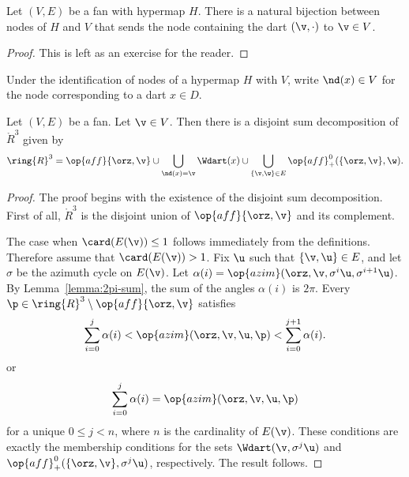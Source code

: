
\begin{lemma}[]\label{lemma:node-vertex}
Let $(V,E)$ be a fan with hypermap $H$.  There is a natural bijection between
nodes of $H$ and $V$ that sends the node containing the dart $(\v,\cdot)$
to $\v\in V$.
\end{lemma}

\begin{proof}  This is left as an exercise for the reader.
\end{proof}

\begin{definition}[$\nd$]
Under the identification of nodes of a hypermap $H$ with $V$,
write $\nd(x)\in V$ for the node corresponding to a dart $x\in D$. 
\end{definition}

\begin{lemma}\label{lemma:disjoint}
Let $(V,E)$ be a fan.  Let $\v\in V$.  
Then
there is a disjoint sum decomposition of $\ring{R}^3$ given by
\begin{displaymath}
\ring{R}^3 = 
\op{aff}\{\orz,\v\} \cup
\bigcup_{\nd(x)=\v} \Wdart(x)  \cup 
\bigcup_{\{\v,\w\}\in E} \op{aff}_+^0(\{\orz,\v\},\w).
\end{displaymath}
\end{lemma}
%
%
%





\begin{proof}
The proof begins with the existence of the disjoint sum decomposition.
First of all, $\ring{R}^3$ is the disjoint union of $\op{aff}\{\orz,\v\}$
and its complement.

The case when $\card(E(\v))\le 1$ follows immediately from the
definitions.  Therefore assume that $\card(E(\v)) >1$.  Fix $\u$ such
that $\{\v,\u\}\in E$, and let $\sigma$ be the azimuth cycle on
$E(\v)$.  Let $\alpha(i)=\op{azim}(\orz,\v,\sigma^i
\u,\sigma^{i+1}\u)$.  By Lemma~\ref{lemma:2pi-sum}, the sum of the
angles $\alpha(i)$ is $2\pi$.  Every
$\p\in\ring{R}^3\setminus\op{aff}\{\orz,\v\}$ satisfies
\begin{displaymath}
\sum_{i=0}^j \alpha(i) <
\op{azim}(\orz,\v,\u,\p) < \sum_{i=0}^{j+1} \alpha(i).
\end{displaymath}
or 
\begin{displaymath}
\sum_{i=0}^j \alpha(i) = \op{azim}(\orz,\v,\u,\p)
\end{displaymath}
for a unique $0 \le j < n$, where $n$ is the cardinality of $E(\v)$. 
These conditions are exactly the membership conditions for the sets
$
\Wdart(\v,\sigma^j \u)
$
and $\op{aff}_+^0(\{\orz,\v\},\sigma^j \u)$, respectively.
The result follows.
\end{proof}

